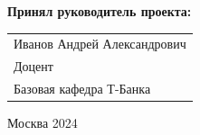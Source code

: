 \begin{titlepage}
\vspace{1em}
{\bf Принял руководитель проекта: \vspace{2mm}}

{
\begin{tabular}{l}
Иванов Андрей Александрович\\
Доцент\\
Базовая кафедра Т-Банка
\end{tabular}}

\vspace{\fill}

\begin{center}
Москва 2024
\end{center}

\end{titlepage}